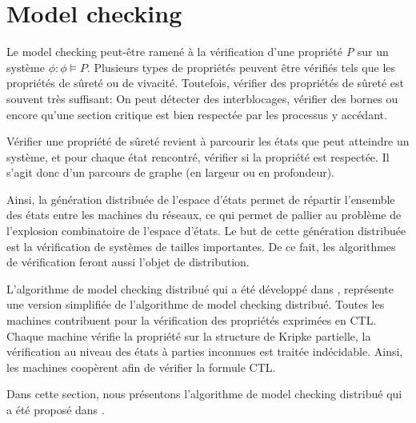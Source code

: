 \section{Model checking}\label{mcd}
Le model checking peut-être ramené à la vérification d'une propriété \emph{P} sur un système $\phi : \phi \models P$. Plusieurs types de propriétés peuvent être vérifiés tels que les propriétés de sûreté ou de vivacité. Toutefois, vérifier des propriétés de sûreté est souvent très suffisant: On peut détecter des interblocages, vérifier des bornes ou encore qu'une section critique est bien respectée par les processus y accédant. 


Vérifier une propriété de sûreté revient à parcourir les états que peut atteindre un système, et pour chaque état rencontré, vérifier si la propriété est respectée. Il s'agit donc d'un parcours de graphe (en largeur ou en profondeur).

Ainsi, la génération distribuée de l'espace d'états permet de répartir l'ensemble des états entre les machines du réseaux, ce qui permet de pallier au problème de l'explosion combinatoire de l'espace d'états. Le but de cette génération distribuée est la vérification de systèmes de tailles importantes. De ce fait, les algorithmes de vérification feront aussi l'objet de distribution. 

L'algorithme de model checking distribué qui a été développé dans \citep{depriester2011bouneb}, représente une version simplifiée de l'algorithme de model checking distribué. Toutes les machines contribuent pour la vérification des propriétés exprimées en CTL. Chaque machine vérifie la propriété sur la structure de Kripke partielle, la vérification au niveau des états à parties inconnues est traitée indécidable. Ainsi, les machines coopèrent afin de vérifier la formule CTL. 

Dans cette section, nous présentons l'algorithme de model checking distribué qui a été proposé dans \citep{depriester2011bouneb}.

